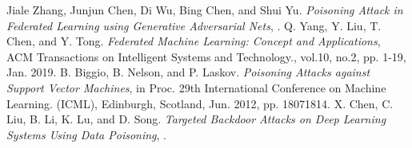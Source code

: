 \documentclass[../main.tex]{subfiles}
\begin{document}
\begin{thebibliography}{0000}
    \newblock Jiale Zhang, Junjun Chen, Di Wu, Bing Chen, and Shui Yu.
    \newblock \emph{Poisoning Attack in Federated Learning using Generative Adversarial Nets},
    .
    \newblock Q. Yang, Y. Liu, T. Chen, and Y. Tong.
    \newblock \emph{Federated Machine Learning: Concept and Applications},
    \newblock ACM Transactions on Intelligent Systems and Technology., vol.10, no.2, pp. 1-19,
    \newblock Jan. 2019.
    \newblock B. Biggio, B. Nelson, and P. Laskov.
    \newblock \emph{Poisoning Attacks against Support Vector Machines},
    \newblock in Proc. 29th International Conference on Machine Learning. (ICML), Edinburgh, Scotland,
    \newblock Jun. 2012, pp. 18071814.
    \newblock X. Chen, C. Liu, B. Li, K. Lu, and D. Song.
    \newblock \emph{Targeted Backdoor Attacks on Deep Learning Systems Using Data Poisoning},
    .
\end{thebibliography}
%
\end{document}
